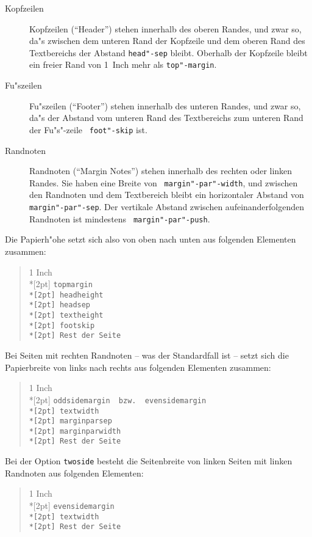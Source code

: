 \begin{description}
\item[Kopfzeilen]
        Kopfzeilen ("`Header"') stehen innerhalb des oberen Randes, und 
        zwar so, da"s zwischen dem unteren Rand der Kopfzeile und dem 
        oberen Rand des Textbereichs der Abstand {\tt\bs head"-sep} 
        bleibt. Oberhalb der Kopfzeile bleibt ein freier Rand von 
        1~Inch mehr als {\tt\bs top"-margin}.

\item[Fu"szeilen]
        Fu"szeilen ("`Footer"') stehen innerhalb des unteren Randes, 
        und zwar so, da"s der Abstand vom unteren Rand des 
        Textbereichs zum unteren Rand der Fu"s"-zeile {\tt\bs 
        foot"-skip} ist.

\item[Randnoten]
        Randnoten ("`Margin Notes"') stehen innerhalb des rechten oder 
        linken Randes. Sie haben eine Breite von {\tt\bs 
        margin"-par"-width}, und zwischen den Randnoten und dem 
        Textbereich bleibt ein horizontaler Abstand von {\tt\bs 
        margin"-par"-sep}. Der vertikale Abstand zwischen 
        aufeinanderfolgenden Randnoten ist mindestens {\tt\bs 
        margin"-par"-push}.

\end{description}

Die Papierh"ohe setzt sich also von oben nach unten
aus folgenden Elementen zusammen:
\begin{verse}
\rm 1 Inch \\*[2pt]
\tt \bs topmargin \\*[2pt]
\bs headheight \\*[2pt]
\bs headsep \\*[2pt]
\bs textheight \\*[2pt]
\bs footskip \\*[2pt]
\rm Rest der Seite
\end{verse}

Bei Seiten mit rechten Randnoten
-- was der Standardfall ist --
setzt sich die Papierbreite
von links nach rechts aus folgenden Elementen zusammen:
\begin{verse}
\rm 1 Inch \\*[2pt]
\tt \bs oddsidemargin\rm\ \ bzw.\ \ \tt \bs evensidemargin \\*[2pt]
\bs textwidth \\*[2pt]
\bs marginparsep \\*[2pt]
\bs marginparwidth \\*[2pt]
\rm Rest der Seite
\end{verse}
Bei der Option {\tt twoside} besteht die Seitenbreite
von linken Seiten mit linken Randnoten
aus folgenden Elementen:
\begin{verse}
\rm 1 Inch \\*[2pt]
\tt \bs evensidemargin \\*[2pt]
\bs textwidth \\*[2pt]
\rm Rest der Seite
\end{verse}

